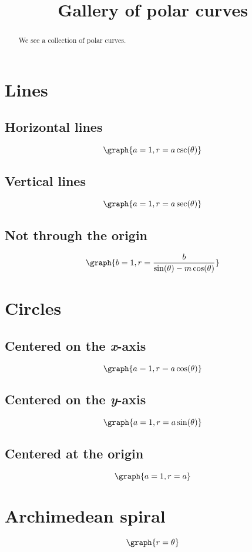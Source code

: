 \documentclass{ximera}
\title[Dig-In:]{Gallery of polar curves}
\begin{document}
\begin{abstract}
We see a collection of polar curves.
\end{abstract}
\maketitle

\section{Lines}

\subsection{Horizontal lines}
\[
\graph{a=1,r=a \csc(\theta)}
\]
\subsection{Vertical lines}
\[
\graph{a=1,r=a \sec(\theta)}
\]
\subsection{Not through the origin}
\[
\graph{b=1,r=\frac{b}{\sin(\theta)-m \cos(\theta)}}
\]

\section{Circles}

\subsection{Centered on the \textit{x}-axis}
\[
\graph{a=1, r=a \cos(\theta)}
\]

\subsection{Centered on the \textit{y}-axis}
\[
\graph{a=1,r=a \sin(\theta)}
\]

\subsection{Centered at the origin}
\[
\graph{a=1,r=a}
\]

\section{Archimedean spiral}
\[
\graph{r=\theta}
\]
\end{document}
